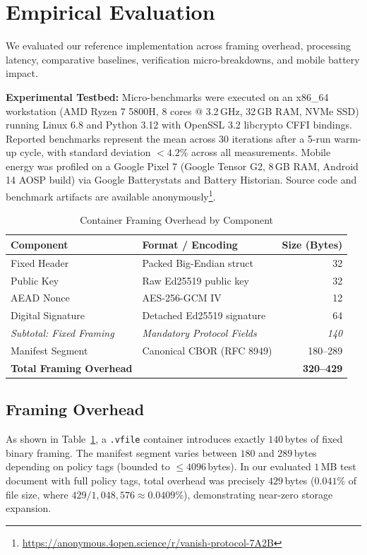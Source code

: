 \section{Empirical Evaluation}
\label{sec:evaluation}

We evaluated our reference implementation across framing overhead, processing latency, comparative baselines, verification micro-breakdowns, and mobile battery impact.

\textbf{Experimental Testbed:} Micro-benchmarks were executed on an x86\_64 workstation (AMD Ryzen 7 5800H, 8 cores @ 3.2\,GHz, 32\,GB RAM, NVMe SSD) running Linux 6.8 and Python 3.12 with OpenSSL 3.2 libcrypto CFFI bindings. Reported benchmarks represent the mean across 30 iterations after a 5-run warm-up cycle, with standard deviation $<4.2\%$ across all measurements. Mobile energy was profiled on a Google Pixel 7 (Google Tensor G2, 8\,GB RAM, Android 14 AOSP build) via Google Batterystats and Battery Historian. Source code and benchmark artifacts are available anonymously\footnote{\url{https://anonymous.4open.science/r/vanish-protocol-7A2B}}.

\begin{table}[t]
\caption{Container Framing Overhead by Component}
\label{tab:overhead}
\centering
\footnotesize
\setlength{\tabcolsep}{2.5pt}
\begin{tabular*}{\columnwidth}{@{\extracolsep{\fill}}llr@{}}
\toprule
\textbf{Component} & \textbf{Format / Encoding} & \textbf{Size (Bytes)} \\
\midrule
Fixed Header & Packed Big-Endian struct & 32 \\
Public Key & Raw Ed25519 public key & 32 \\
AEAD Nonce & AES-256-GCM IV & 12 \\
Digital Signature & Detached Ed25519 signature & 64 \\
\midrule
\textit{Subtotal: Fixed Framing} & \textit{Mandatory Protocol Fields} & \textit{140} \\
\midrule
Manifest Segment & Canonical CBOR (RFC 8949) & 180--289 \\
\midrule
\textbf{Total Framing Overhead} & & \textbf{320--429} \\
\bottomrule
\end{tabular*}
\end{table}

\subsection{Framing Overhead}
As shown in Table~\ref{tab:overhead}, a \texttt{.vfile} container introduces exactly $140$\,bytes of fixed binary framing. The manifest segment varies between $180$ and $289$\,bytes depending on policy tags (bounded to $\le 4096$\,bytes). In our evaluated $1$\,MB test document with full policy tags, total overhead was precisely $429$\,bytes ($0.041\%$ of file size, where $429 / 1{,}048{,}576 \approx 0.0409\%$), demonstrating near-zero storage expansion.

